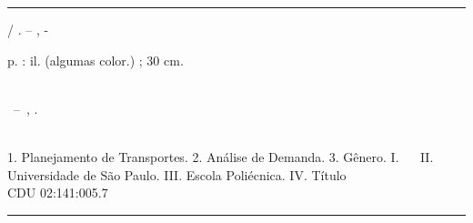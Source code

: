 \documentclass[
  12pt,        %
  openright,      %
  twoside,      %
  a4paper,      %
  english,      %
  brazil        %
]{abntex2}
\begin{document}
\frenchspacing


\imprimircapa

\imprimirfolhaderosto*


%
%     
\begin{fichacatalografica}
  \vspace*{\fill}          %
  \hrule              %
  \begin{center}          %
  \begin{minipage}[c]{12.5cm}    %

  \imprimirautor

  \hspace{0.5cm} \imprimirtitulo  / \imprimirautor. --
  \imprimirlocal, \imprimirdata-

  \hspace{0.5cm} \pageref{LastPage} p. : il. (algumas color.) ; 30 cm.\\

  \hspace{0.5cm} \imprimirorientadorRotulo~\imprimirorientador\\


  \hspace{0.5cm}
  \parbox[t]{\textwidth}{\imprimirtipotrabalho~--~\imprimirinstituicao,
  \imprimirdata.}\\

  \hspace{0.5cm} 
    1. Planejamento de Transportes.
    2. Análise de Demanda.
    3. Gênero.
    I. \imprimirorientadorRotulo~\imprimirorientador~
    II. Universidade de São Paulo.
    III. Escola Poliécnica.
    IV. Título\\

  \hspace{8.75cm} CDU 02:141:005.7\\ %

  \end{minipage}
  \end{center}
  \hrule
\end{fichacatalografica}
\end{document}
